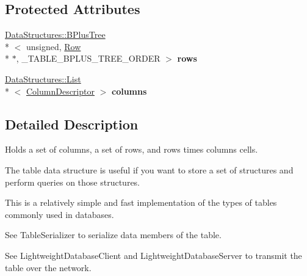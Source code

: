 \subsection*{Protected Attributes}
\begin{DoxyCompactItemize}
\item 
\hypertarget{class_data_structures_1_1_table_a5dbe3b763c4ba74b34c02b08fd4ad88e}{\hyperlink{class_data_structures_1_1_b_plus_tree}{Data\-Structures\-::\-B\-Plus\-Tree}\\*
$<$ unsigned, \hyperlink{struct_data_structures_1_1_table_1_1_row}{Row} \\*
$\ast$, \-\_\-\-T\-A\-B\-L\-E\-\_\-\-B\-P\-L\-U\-S\-\_\-\-T\-R\-E\-E\-\_\-\-O\-R\-D\-E\-R $>$ {\bfseries rows}}\label{class_data_structures_1_1_table_a5dbe3b763c4ba74b34c02b08fd4ad88e}

\item 
\hypertarget{class_data_structures_1_1_table_a4db7dd0db18e0403b760b984defbafc9}{\hyperlink{class_data_structures_1_1_list}{Data\-Structures\-::\-List}\\*
$<$ \hyperlink{struct_data_structures_1_1_table_1_1_column_descriptor}{Column\-Descriptor} $>$ {\bfseries columns}}\label{class_data_structures_1_1_table_a4db7dd0db18e0403b760b984defbafc9}

\end{DoxyCompactItemize}


\subsection{Detailed Description}
Holds a set of columns, a set of rows, and rows times columns cells. 

The table data structure is useful if you want to store a set of structures and perform queries on those structures.\par
 This is a relatively simple and fast implementation of the types of tables commonly used in databases.\par
 See Table\-Serializer to serialize data members of the table.\par
 See Lightweight\-Database\-Client and Lightweight\-Database\-Server to transmit the table over the network. 

